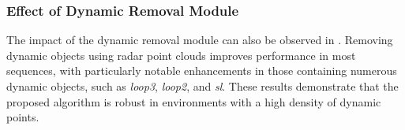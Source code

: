 \subsubsection{Effect of Dynamic Removal Module}
The impact of the dynamic removal module can also be observed in .
Removing dynamic objects using radar point clouds improves performance in most sequences, with particularly notable enhancements in those containing numerous dynamic objects, such as \textit{loop3}, \textit{loop2}, and \textit{sl}.
These results demonstrate that the proposed algorithm is robust in environments with a high density of dynamic points.
